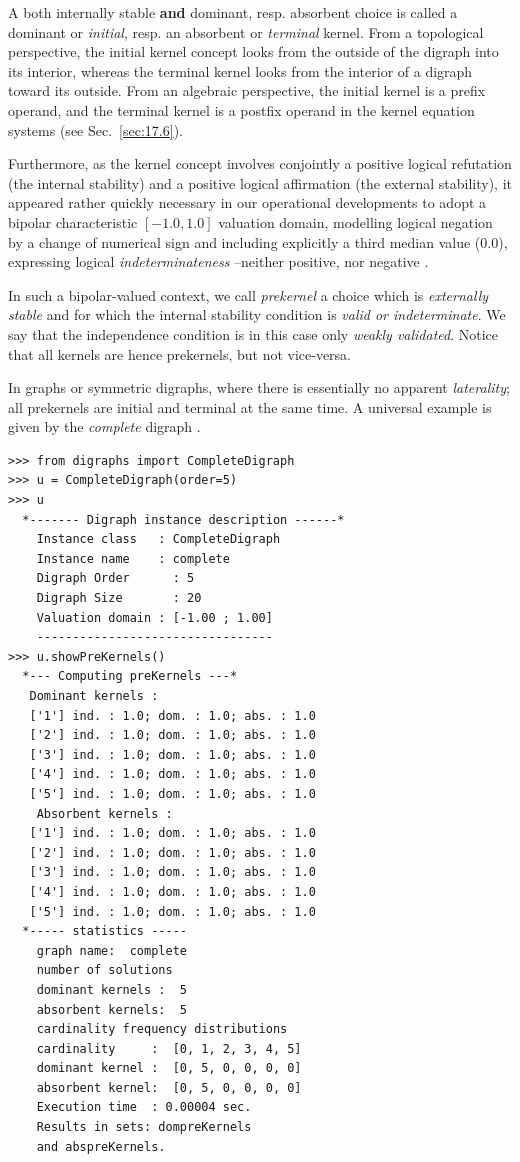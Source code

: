 A both internally stable \textbf{and} dominant, resp. absorbent choice is called a dominant or \emph{initial}, resp. an absorbent or \emph{terminal} kernel. From a topological perspective, the initial kernel concept looks from the outside of the digraph into its interior, whereas the terminal kernel looks from the interior of a digraph toward its outside. From an algebraic perspective, the initial kernel is a prefix operand, and the terminal kernel is a postfix operand in the kernel equation systems (see Sec.~\vref{sec:17.6}).

Furthermore, as the kernel concept involves conjointly a positive logical refutation (the internal stability) and a positive logical affirmation (the external stability), it appeared rather quickly necessary in our operational developments to adopt a bipolar characteristic $[-1.0,1.0]$ valuation domain, modelling logical negation by a change of numerical sign and including explicitly a third median value ($0.0$), expressing logical \emph{indeterminateness} --neither positive, nor negative \citep{BIS-2000,BIS-2002,BIS-2004a}.

In such a  bipolar-valued context, we call \emph{prekernel} a choice which is \emph{externally stable} and for which the internal stability condition is \emph{valid or indeterminate}. We say that the independence condition is in this case only \emph{weakly validated}. Notice that all kernels are hence prekernels, but not vice-versa.

In graphs or symmetric digraphs, where there is essentially no apparent \emph{laterality}; all prekernels are initial and terminal at the same time. A universal example is given by the \emph{complete} digraph .
\begin{lstlisting}[caption={The prekernels of a complete digraph},label=list:17.3]
>>> from digraphs import CompleteDigraph
>>> u = CompleteDigraph(order=5)
>>> u
  *------- Digraph instance description ------*
    Instance class   : CompleteDigraph
    Instance name    : complete
    Digraph Order      : 5
    Digraph Size       : 20
    Valuation domain : [-1.00 ; 1.00]
    ---------------------------------
>>> u.showPreKernels()
  *--- Computing preKernels ---*
   Dominant kernels :
   ['1'] ind. : 1.0; dom. : 1.0; abs. : 1.0
   ['2'] ind. : 1.0; dom. : 1.0; abs. : 1.0
   ['3'] ind. : 1.0; dom. : 1.0; abs. : 1.0
   ['4'] ind. : 1.0; dom. : 1.0; abs. : 1.0
   ['5'] ind. : 1.0; dom. : 1.0; abs. : 1.0
    Absorbent kernels :
   ['1'] ind. : 1.0; dom. : 1.0; abs. : 1.0
   ['2'] ind. : 1.0; dom. : 1.0; abs. : 1.0
   ['3'] ind. : 1.0; dom. : 1.0; abs. : 1.0
   ['4'] ind. : 1.0; dom. : 1.0; abs. : 1.0
   ['5'] ind. : 1.0; dom. : 1.0; abs. : 1.0
  *----- statistics -----
    graph name:  complete
    number of solutions
    dominant kernels :  5
    absorbent kernels:  5
    cardinality frequency distributions
    cardinality     :  [0, 1, 2, 3, 4, 5]
    dominant kernel :  [0, 5, 0, 0, 0, 0]
    absorbent kernel:  [0, 5, 0, 0, 0, 0]
    Execution time  : 0.00004 sec.
    Results in sets: dompreKernels
    and abspreKernels.
\end{lstlisting}

